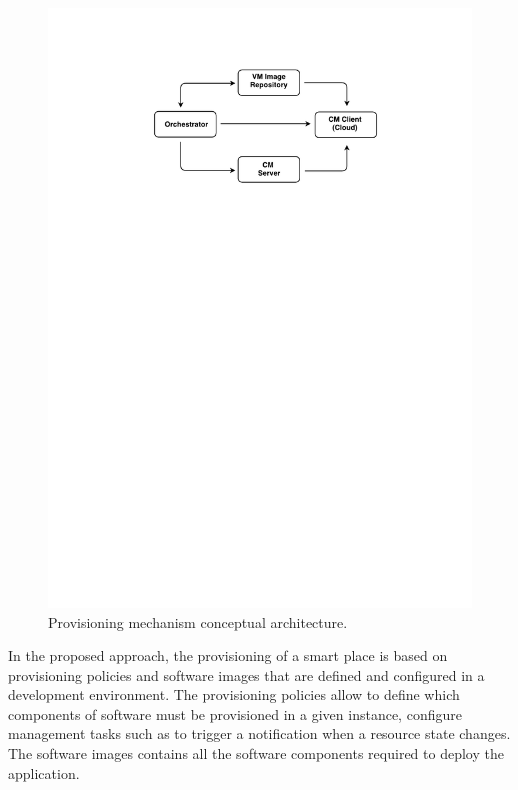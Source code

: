 \begin{figure}[ht!]
\centering
\includegraphics[width=.7\textwidth]{images/c4t-generic-solution.pdf}
\caption[Provisioning mechanism conceptual architecture.]{Provisioning mechanism conceptual architecture.}
\label{fig:provisioning_generic_architecture}
\end{figure}

In the proposed approach, the provisioning of a smart place is based on provisioning policies and
software images that are defined and configured in a development environment. The provisioning policies
allow to define which components of software must be provisioned in a given instance, configure
management tasks such as to trigger a notification when a resource state changes. The software images
contains all the software components required to deploy the application.\\

